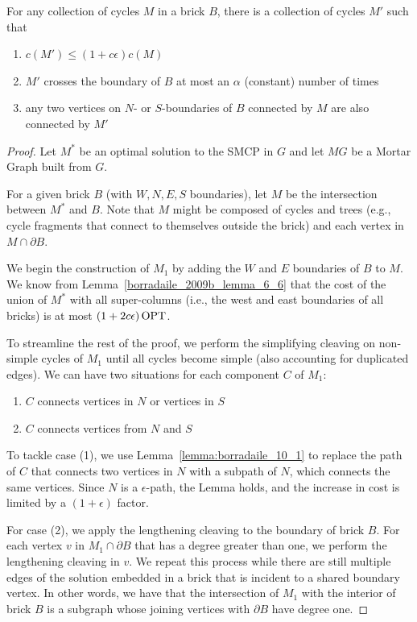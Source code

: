 \begin{fcorollary}\label{bateni_4_1_multicycle}
For any collection of cycles \(M\) in a brick \(B\), there is a collection of cycles \(M'\) such that
\begin{enumerate}
    \item \(c(M') \leq (1 + c \epsilon)c(M)\)
    \item \(M'\) crosses the boundary of \(B\) at most an \(\alpha\) (constant) number of times
    \item any two vertices on \(N\)- or \(S\)-boundaries of \(B\) connected by \(M\) are also connected by \(M'\)
\end{enumerate}
\end{fcorollary}
\begin{proof}
    Let \(M^\ast\) be an optimal solution to the SMCP in \(G\) and let \(MG\) be a Mortar Graph built from \(G\). 

    For a given brick \(B\) (with \(W, N, E, S\) boundaries), let \(M\) be the intersection between \(M^\ast\) and \(B\). Note that \(M\) might be composed of cycles and trees (e.g., cycle fragments that connect to themselves outside the brick) and each vertex in \(M \cap \partial B\).

    We begin the construction of \(M_1\) by adding the \(W\) and \(E\) boundaries of \(B\) to \(M\). We know from Lemma~\ref{borradaile_2009b_lemma_6_6} that the cost of the union of \(M^\ast\) with all super-columns (i.e., the west and east boundaries of all bricks) is at most \((1 + 2 c \epsilon) \operatorname{\textrm{OPT}}\).

    To streamline the rest of the proof, we perform the simplifying cleaving on non-simple cycles of \(M_1\) until all cycles become simple (also accounting for duplicated edges).
    We can have two situations for each component \(C\) of \(M_1\):
    \begin{enumerate}
        \item \(C\) connects vertices in \(N\) or vertices in \(S\)
        \item \(C\) connects vertices from \(N\) and \(S\)
    \end{enumerate}

    To tackle case (1), we use Lemma~\ref{lemma:borradaile_10_1} to replace the path of \(C\) that connects two vertices in \(N\) with a subpath of \(N\), which connects the same vertices. Since \(N\) is a \(\epsilon\)-path, the Lemma holds, and the increase in cost is limited by a \((1 + \epsilon)\) factor.

    For case (2), we apply the lengthening cleaving to the boundary of brick \(B\). For each vertex \(v\) in \(M_1 \cap \partial B\) that has a degree greater than one, we perform the lengthening cleaving in \(v\). We repeat this process while there are still multiple edges of the solution embedded in a brick that is incident to a shared boundary vertex. In other words, we have that the intersection of \(M_1\) with the interior of brick \(B\) is a subgraph whose joining vertices with \(\partial B\) have degree one.



\end{proof}
